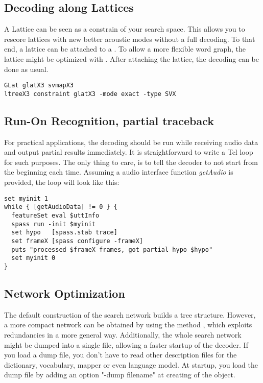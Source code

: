 \subsection{Decoding along Lattices}

A Lattice can be seen as a constrain of your search space. This allows
you to rescore lattices with new  better acoustic modes without a full
decoding.  To  that  end,     a lattice   can    be  attached  to    a
. To allow a more flexible word graph, the lattice
might  be optimized  with .   After attaching the
lattice, the decoding can be done as usual.

\begin{verbatim}
GLat glatX3 svmapX3
ltreeX3 constraint glatX3 -mode exact -type SVX
\end{verbatim}


\subsection{Run-On Recognition, partial traceback}

For practical applications, the decoding should  be run while receiving
audio data and    output     partial results immediately.     It    is
straightforward to write a Tcl loop for  such purposes. The only thing
to care, is  to tell the decoder to  not start from the beginning each
time. Assuming a audio  interface function {\em getAudio} is provided,
the loop will look like this:

\begin{verbatim}
set myinit 1
while { [getAudioData] != 0 } {
  featureSet eval $uttInfo
  spass run -init $myinit
  set hypo   [spass.stab trace]
  set frameX [spass configure -frameX]
  puts "processed $frameX frames, got partial hypo $hypo"
  set myinit 0
}
\end{verbatim}
 

\subsection{Network Optimization}

The default construction of  the search network builds a  tree
structure.  However, a more compact  network can be obtained by  using
the method  ,  which exploits  redundancies in  a
more  general way.   Additionally,  the  whole search  network  might be
dumped  into  a   single file, allowing   a   faster  startup  of  the
decoder. If  you  load  a dump  file,  you  don't have to   read other
description  files  for  the dictionary,  vocabulary,   mapper or even
language model. At startup, you load the dump file by adding an option
"-dump filename" at creating of the  object.

